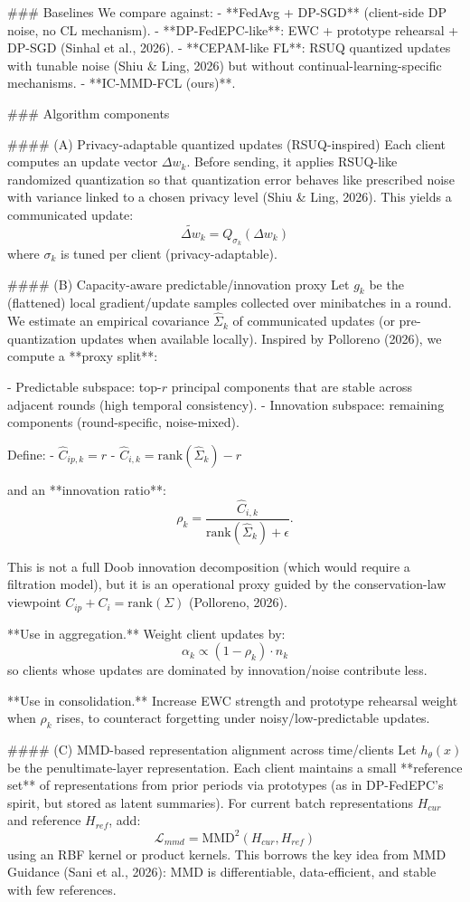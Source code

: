 ### Baselines  
We compare against:  
- **FedAvg + DP-SGD** (client-side DP noise, no CL mechanism).  
- **DP-FedEPC-like**: EWC + prototype rehearsal + DP-SGD (Sinhal et al., 2026).  
- **CEPAM-like FL**: RSUQ quantized updates with tunable noise (Shiu & Ling, 2026) but without continual-learning-specific mechanisms.  
- **IC-MMD-FCL (ours)**.

### Algorithm components  

#### (A) Privacy-adaptable quantized updates (RSUQ-inspired)  
Each client computes an update vector \(\Delta w_k\). Before sending, it applies RSUQ-like randomized quantization so that quantization error behaves like prescribed noise with variance linked to a chosen privacy level (Shiu & Ling, 2026). This yields a communicated update:
\[
\widetilde{\Delta w}_k = Q_{\sigma_k}(\Delta w_k)
\]
where \(\sigma_k\) is tuned per client (privacy-adaptable).

#### (B) Capacity-aware predictable/innovation proxy  
Let \(g_k\) be the (flattened) local gradient/update samples collected over minibatches in a round. We estimate an empirical covariance \(\widehat{\Sigma}_k\) of communicated updates (or pre-quantization updates when available locally). Inspired by Polloreno (2026), we compute a **proxy split**:

- Predictable subspace: top-\(r\) principal components that are stable across adjacent rounds (high temporal consistency).  
- Innovation subspace: remaining components (round-specific, noise-mixed).

Define:
- \(\widehat{C}_{ip,k} = r\)  
- \(\widehat{C}_{i,k} = \mathrm{rank}(\widehat{\Sigma}_k)-r\)

and an **innovation ratio**:
\[
\rho_k = \frac{\widehat{C}_{i,k}}{\mathrm{rank}(\widehat{\Sigma}_k)+\epsilon}.
\]

This is not a full Doob innovation decomposition (which would require a filtration model), but it is an operational proxy guided by the conservation-law viewpoint \(C_{ip}+C_i=\mathrm{rank}(\Sigma)\) (Polloreno, 2026).

**Use in aggregation.** Weight client updates by:
\[
\alpha_k \propto (1-\rho_k)\cdot n_k
\]
so clients whose updates are dominated by innovation/noise contribute less.

**Use in consolidation.** Increase EWC strength and prototype rehearsal weight when \(\rho_k\) rises, to counteract forgetting under noisy/low-predictable updates.

#### (C) MMD-based representation alignment across time/clients  
Let \(h_\theta(x)\) be the penultimate-layer representation. Each client maintains a small **reference set** of representations from prior periods via prototypes (as in DP-FedEPC’s spirit, but stored as latent summaries). For current batch representations \(H_{cur}\) and reference \(H_{ref}\), add:
\[
\mathcal{L}_{mmd} = \mathrm{MMD}^2(H_{cur}, H_{ref})
\]
using an RBF kernel or product kernels. This borrows the key idea from MMD Guidance (Sani et al., 2026): MMD is differentiable, data-efficient, and stable with few references.

